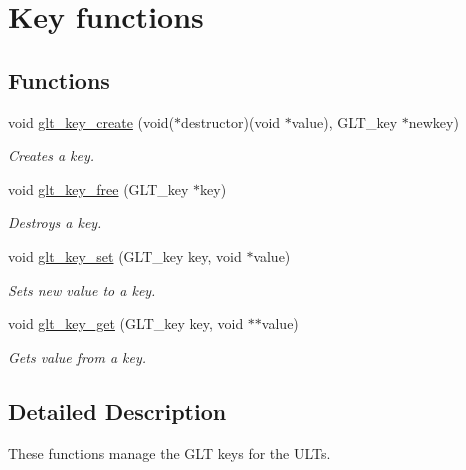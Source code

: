 \hypertarget{group__KEY}{\section{Key functions}
\label{group__KEY}
}
\subsection*{Functions}
\begin{DoxyCompactItemize}
\item 
void \hyperlink{group__KEY_gacadf8a24eb507018200042230da3e2b2}{glt\-\_\-key\-\_\-create} (void($\ast$destructor)(void $\ast$value), G\-L\-T\-\_\-key $\ast$newkey)
\begin{DoxyCompactList}\small\item\em Creates a key. \end{DoxyCompactList}\item 
void \hyperlink{group__KEY_ga36e5411473e454c0e7ae82992f9dfcbf}{glt\-\_\-key\-\_\-free} (G\-L\-T\-\_\-key $\ast$key)
\begin{DoxyCompactList}\small\item\em Destroys a key. \end{DoxyCompactList}\item 
void \hyperlink{group__KEY_gaaa5f2bd888a6cd8d8c811bf4a02c9f3f}{glt\-\_\-key\-\_\-set} (G\-L\-T\-\_\-key key, void $\ast$value)
\begin{DoxyCompactList}\small\item\em Sets new value to a key. \end{DoxyCompactList}\item 
void \hyperlink{group__KEY_ga2a3c3de9cfc563501468c2f2aa6cf734}{glt\-\_\-key\-\_\-get} (G\-L\-T\-\_\-key key, void $\ast$$\ast$value)
\begin{DoxyCompactList}\small\item\em Gets value from a key. \end{DoxyCompactList}\end{DoxyCompactItemize}


\subsection{Detailed Description}
These functions manage the G\-L\-T keys for the U\-L\-Ts. 

